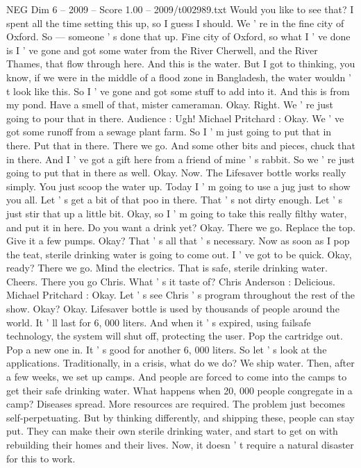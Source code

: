 \begin{textsample}{NEG Dim 6 – 2009 – Score 1.00 – 2009/t002989.txt}
Would you like to see that?
I spent all the time setting this up, so I guess I should.
We ' re in the fine city of Oxford.
So — someone ' s done that up.
Fine city of Oxford, so what I ' ve done is I ' ve gone and got some water from the River Cherwell, and the River Thames, that flow through here.
And this is the water.
But I got to thinking, you know, if we were in the middle of a flood zone in Bangladesh, the water wouldn ' t look like this.
So I ' ve gone and got some stuff to add into it.
And this is from my pond.
Have a smell of that, mister cameraman.
Okay.
Right.
We ' re just going to pour that in there.
Audience : Ugh!
Michael Pritchard : Okay.
We ' ve got some runoff from a sewage plant farm.
So I ' m just going to put that in there.
Put that in there.
There we go.
And some other bits and pieces, chuck that in there.
And I ' ve got a gift here from a friend of mine ' s rabbit.
So we ' re just going to put that in there as well.
Okay.
Now.
The Lifesaver bottle works really simply.
You just scoop the water up.
Today I ' m going to use a jug just to show you all.
Let ' s get a bit of that poo in there.
That ' s not dirty enough.
Let ' s just stir that up a little bit.
Okay, so I ' m going to take this really filthy water, and put it in here.
Do you want a drink yet?
Okay.
There we go.
Replace the top.
Give it a few pumps.
Okay?
That ' s all that ' s necessary.
Now as soon as I pop the teat, sterile drinking water is going to come out.
I ' ve got to be quick.
Okay, ready?
There we go.
Mind the electrics.
That is safe, sterile drinking water.
Cheers.
There you go Chris.
What ' s it taste of?
Chris Anderson : Delicious.
Michael Pritchard : Okay.
Let ' s see Chris ' s program throughout the rest of the show.
Okay?
Okay.
Lifesaver bottle is used by thousands of people around the world.
It ' ll last for 6, 000 liters.
And when it ' s expired, using failsafe technology, the system will shut off, protecting the user.
Pop the cartridge out.
Pop a new one in.
It ' s good for another 6, 000 liters.
So let ' s look at the applications.
Traditionally, in a crisis, what do we do?
We ship water.
Then, after a few weeks, we set up camps.
And people are forced to come into the camps to get their safe drinking water.
What happens when 20, 000 people congregate in a camp?
Diseases spread.
More resources are required.
The problem just becomes self-perpetuating.
But by thinking differently, and shipping these, people can stay put.
They can make their own sterile drinking water, and start to get on with rebuilding their homes and their lives.
Now, it doesn ' t require a natural disaster for this to work.

\end{textsample}
